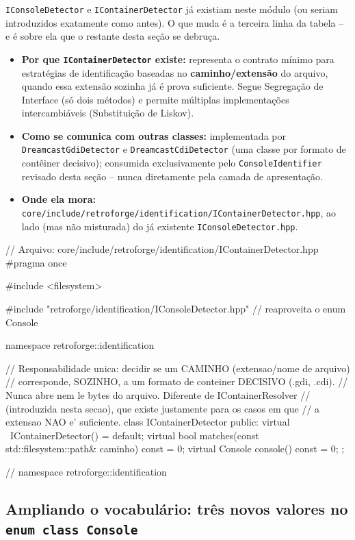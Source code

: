 \texttt{IConsoleDetector} e \texttt{IContainerDetector} já existiam neste módulo (ou seriam introduzidos exatamente como antes). O que muda é a terceira linha da tabela -- e é sobre ela que o restante desta seção se debruça.

\begin{itemize}
    \item \textbf{Por que \texttt{IContainerDetector} existe:} representa o contrato mínimo para estratégias de identificação baseadas no \textbf{caminho/extensão} do arquivo, quando essa extensão sozinha já é prova suficiente. Segue Segregação de Interface (só dois métodos) e permite múltiplas implementações intercambiáveis (Substituição de Liskov).
    \item \textbf{Como se comunica com outras classes:} implementada por \texttt{DreamcastGdiDetector} e \texttt{DreamcastCdiDetector} (uma classe por formato de contêiner decisivo); consumida exclusivamente pelo \texttt{ConsoleIdentifier} revisado desta seção -- nunca diretamente pela camada de apresentação.
    \item \textbf{Onde ela mora:} \texttt{core/include/retroforge/identification/IContainerDetector.hpp}, ao lado (mas não misturada) do já existente \texttt{IConsoleDetector.hpp}.
\end{itemize}

\begin{CaixaCodigo}
// Arquivo: core/include/retroforge/identification/IContainerDetector.hpp
#pragma once

#include <filesystem>

#include "retroforge/identification/IConsoleDetector.hpp" // reaproveita o enum Console

namespace retroforge::identification {

// Responsabilidade unica: decidir se um CAMINHO (extensao/nome de arquivo)
// corresponde, SOZINHO, a um formato de conteiner DECISIVO (.gdi, .cdi).
// Nunca abre nem le bytes do arquivo. Diferente de IContainerResolver
// (introduzida nesta secao), que existe justamente para os casos em que
// a extensao NAO e' suficiente.
class IContainerDetector {
public:
    virtual ~IContainerDetector() = default;
    virtual bool matches(const std::filesystem::path& caminho) const = 0;
    virtual Console console() const = 0;
};

} // namespace retroforge::identification
\end{CaixaCodigo}

\subsection{Ampliando o vocabulário: três novos valores no \texttt{enum class Console}}

